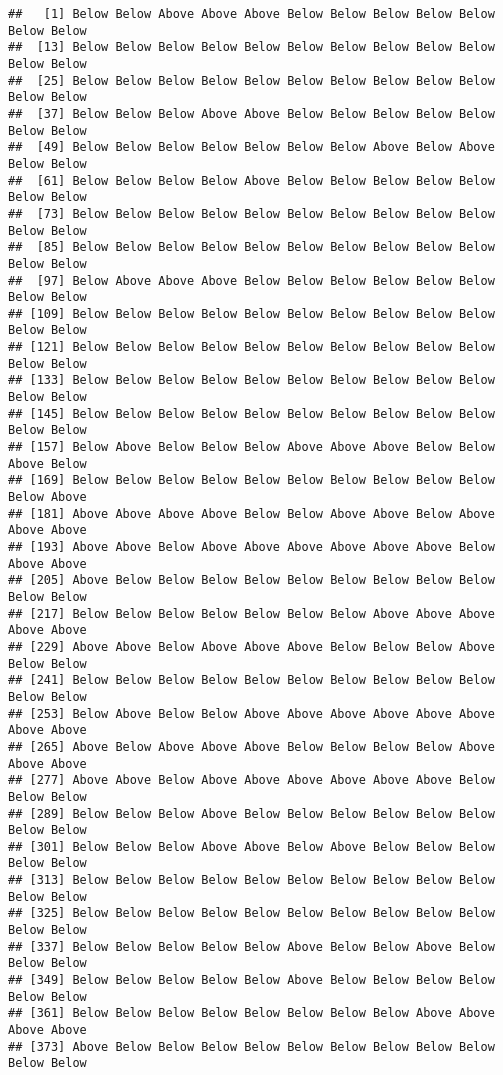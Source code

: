 \documentclass[
]{article}
\begin{document}
\begin{verbatim}
##   [1] Below Below Above Above Above Below Below Below Below Below Below Below
##  [13] Below Below Below Below Below Below Below Below Below Below Below Below
##  [25] Below Below Below Below Below Below Below Below Below Below Below Below
##  [37] Below Below Below Above Above Below Below Below Below Below Below Below
##  [49] Below Below Below Below Below Below Below Above Below Above Below Below
##  [61] Below Below Below Below Above Below Below Below Below Below Below Below
##  [73] Below Below Below Below Below Below Below Below Below Below Below Below
##  [85] Below Below Below Below Below Below Below Below Below Below Below Below
##  [97] Below Above Above Above Below Below Below Below Below Below Below Below
## [109] Below Below Below Below Below Below Below Below Below Below Below Below
## [121] Below Below Below Below Below Below Below Below Below Below Below Below
## [133] Below Below Below Below Below Below Below Below Below Below Below Below
## [145] Below Below Below Below Below Below Below Below Below Below Below Below
## [157] Below Above Below Below Below Above Above Above Below Below Above Below
## [169] Below Below Below Below Below Below Below Below Below Below Below Above
## [181] Above Above Above Above Below Below Above Above Below Above Above Above
## [193] Above Above Below Above Above Above Above Above Above Below Above Above
## [205] Above Below Below Below Below Below Below Below Below Below Below Below
## [217] Below Below Below Below Below Below Below Above Above Above Above Above
## [229] Above Above Below Above Above Above Below Below Below Above Below Below
## [241] Below Below Below Below Below Below Below Below Below Below Below Below
## [253] Below Above Below Below Above Above Above Above Above Above Above Above
## [265] Above Below Above Above Above Below Below Below Below Above Above Above
## [277] Above Above Below Above Above Above Above Above Above Below Below Below
## [289] Below Below Below Above Below Below Below Below Below Below Below Below
## [301] Below Below Below Above Above Below Above Below Below Below Below Below
## [313] Below Below Below Below Below Below Below Below Below Below Below Below
## [325] Below Below Below Below Below Below Below Below Below Below Below Below
## [337] Below Below Below Below Below Above Below Below Above Below Below Below
## [349] Below Below Below Below Below Above Below Below Below Below Below Below
## [361] Below Below Below Below Below Below Below Below Above Above Above Above
## [373] Above Below Below Below Below Below Below Below Below Below Below Below

\end{verbatim}
\end{document}
